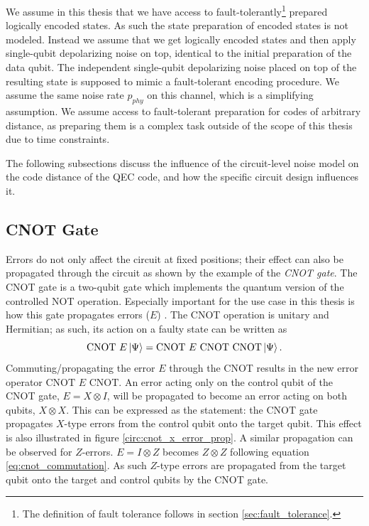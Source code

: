 We assume in this thesis that we have access to fault-tolerantly\footnote{
    The definition of fault tolerance follows in section \ref{sec:fault_tolerance}.
    } prepared logically encoded states.
As such the state preparation of encoded states is not modeled.
Instead we assume that we get logically encoded states and then apply single-qubit depolarizing noise on top, identical to the initial preparation of the data qubit.
The independent single-qubit depolarizing noise placed on top of the resulting state is supposed to mimic a fault-tolerant encoding procedure. 
We assume the same noise rate $p_{phy}$ on this channel, which is a simplifying assumption.
We assume access to fault-tolerant preparation for codes of arbitrary distance, 
as preparing them is a complex task outside of the scope of this thesis due to time constraints.

The following subsections discuss the influence of the circuit-level noise model on the code distance of the QEC code, 
and how the specific circuit design influences it. 


\subsection{CNOT Gate}\label{ssec:cnot_gate}

Errors do not only affect the circuit at fixed positions; their effect can also be propagated through the circuit as shown by the example of the \emph{CNOT gate}. 
The CNOT gate is a two-qubit gate which implements the quantum version of the controlled NOT operation.
Especially important for the use case in this thesis is how this gate propagates errors ($E$) \cite{gottesmann_book}.
The CNOT operation is unitary and Hermitian; as such, its action on a faulty state can be written as 
\begin{equation}
    \text{CNOT} \ E\ket{\Psi} = \text{CNOT } E\text{ CNOT} \ \text{CNOT} \ket{\Psi}.
    \label{eq:cnot_commutation}
\end{equation}
Commuting/propagating the error $E$ through the CNOT results in the new error operator $\text{CNOT } E \text{ CNOT}$.
An error acting only on the control qubit of the CNOT gate, $E = X \otimes I$, will be propagated to become an error acting on both qubits, $X \otimes X$.
This can be expressed as the statement: 
the CNOT gate propagates $X$-type errors from the control qubit onto the target qubit.
This effect is also illustrated in figure \ref{circ:cnot_x_error_prop}.
A similar propagation can be observed for $Z$-errors.
$E = I \otimes Z$ becomes $Z \otimes Z$ following equation \eqref{eq:cnot_commutation}. 
As such $Z$-type errors are propagated from the target qubit onto the target and control qubits by the CNOT gate.


